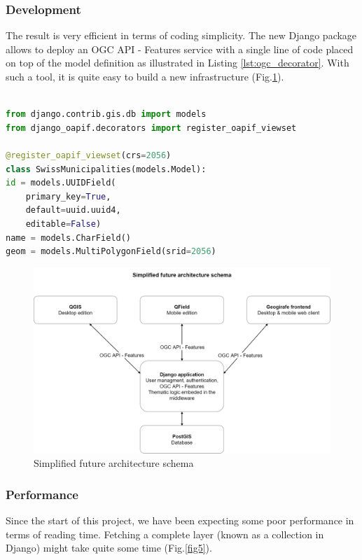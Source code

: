 \documentclass[runningheads]{llncs}
\begin{document}
\subsubsection{Development}

The result is very efficient in terms of coding simplicity. The new Django package allows to deploy an OGC API - Features service with a single line of code placed on top of the model definition as illustrated in Listing \ref{lst:ogc_decorator}. With such a tool, it is quite easy to build a new infrastructure (Fig.\ref{fig4}).

\begin{lstlisting}[language=Python, caption=Python code sample, label={lst:ogc_decorator}]

from django.contrib.gis.db import models
from django_oapif.decorators import register_oapif_viewset

@register_oapif_viewset(crs=2056)
class SwissMunicipalities(models.Model):
id = models.UUIDField(
	primary_key=True,
	default=uuid.uuid4, 
	editable=False)
name = models.CharField()
geom = models.MultiPolygonField(srid=2056)
\end{lstlisting}


\begin{figure}
	\includegraphics[width=\textwidth]{future-architecture.png}
	\caption{Simplified future architecture schema} \label{fig4}
\end{figure}


\subsubsection{Performance}

Since the start of this project, we have been expecting some poor performance in terms of reading time. Fetching a complete layer (known as a collection in Django) might take quite some time (Fig.\ref{fig5}).
\end{document}
